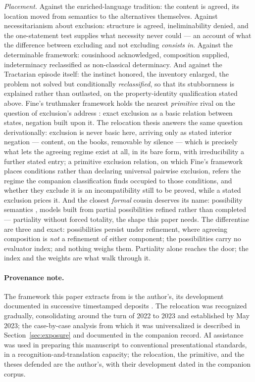 \documentclass[11pt]{article}
\begin{document}
\emph{Placement.} Against the enriched-language tradition: the content is agreed, its location moved from semantics to the alternatives themselves. Against necessitarianism about exclusion: structure is agreed, ineliminability denied, and the one-statement test supplies what necessity never could --- an account of what the difference between excluding and not excluding \emph{consists in}. Against the determinable framework: cousinhood acknowledged, composition supplied, indeterminacy reclassified as non-classical determinacy. And against the Tractarian episode itself: the instinct honored, the inventory enlarged, the problem not solved but conditionally \emph{reclassified}, so that its stubbornness is explained rather than outlasted, on the property-identity qualification stated above. Fine's truthmaker framework holds the nearest \emph{primitive} rival on the question of exclusion's address \cite{fine2017truthmaker}: exact exclusion as a basic relation between states, negation built upon it. The relocation thesis answers the same question derivationally: exclusion is never basic here, arriving only as stated interior negation --- content, on the books, removable by silence --- which is precisely what lets the agreeing regime exist at all, in its bare form, with irreducibility a further stated entry; a primitive exclusion relation, on which Fine's framework places conditions rather than declaring universal pairwise exclusion, refers the regime the companion classification finds occupied to those conditions, and whether they exclude it is an incompatibility still to be proved, while a stated exclusion prices it. And the closest \emph{formal} cousin deserves its name: possibility semantics \cite{humberstone1981from, holliday2021possibility}, models built from partial possibilities refined rather than completed --- partiality without forced totality, the shape this paper needs. The differentiae are three and exact: possibilities persist under refinement, where agreeing composition is \emph{not} a refinement of either component; the possibilities carry no evaluator index; and nothing weighs them. Partiality alone reaches the door; the index and the weights are what walk through it.

\paragraph*{Provenance note.} The framework this paper extracts from is the author's, its development documented in successive timestamped deposits \parencite{Aethus, AethusBrief}. The relocation was recognized gradually, consolidating around the turn of 2022 to 2023 and established by May 2023; the case-by-case analysis from which it was universalized is described in Section~\ref{sec:exposure} and documented in the companion record. AI assistance was used in preparing this manuscript to conventional presentational standards, in a recognition-and-translation capacity; the relocation, the primitive, and the theses defended are the author's, with their development dated in the companion corpus.
\end{document}
